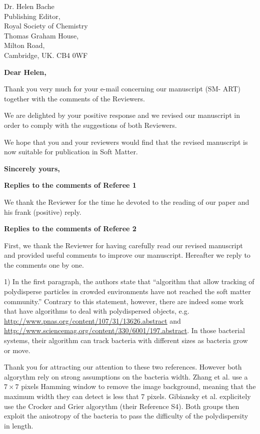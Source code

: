 \documentclass[a4paper, rebuttal, parskip=true, firsthead=false, fromemail=true, foldmarks=false]{scrlttr2}
\begin{document}
 
\begin{letter}{Dr. Helen Bache\\
Publishing Editor,\\
Royal Society of Chemistry\\
Thomas Graham House,\\
Milton Road,\\
Cambridge, UK. CB4 0WF}
\opening{\bf Dear Helen,}

Thank you very much for your e-mail concerning our manuscript (SM\nobreakdash- ART) together with the comments of the Reviewers.

We are delighted by your positive response and we revised our manuscript in order to comply with the suggestions of both Reviewers.


We hope that you and your reviewers would find that the revised manuscript is now suitable for publication in Soft Matter. 

\closing{\bf Sincerely yours,} 
\clearpage

\textsf{\textbf{Replies to the comments of Referee 1}}

We thank the Reviewer for the time he devoted to the reading of our paper and his frank (positive) reply.

\textsf{\textbf{Replies to the comments of Referee 2}}

First, we thank the Reviewer for having carefully read our revised manuscript and provided useful comments to improve our manuscript. 
Hereafter we reply to the comments one by one.

\begin{quotationi}
1)      In the first paragraph, the authors state that ``algorithm that allow tracking of polydisperse particles in crowded environments have not reached the soft matter community.'' Contrary to this statement, however, there are indeed some work that have algorithms to deal with polydispersed objects, e.g. \url{http://www.pnas.org/content/107/31/13626.abstract} and \url{http://www.sciencemag.org/content/330/6001/197.abstract}. In those bacterial systems, their algorithm can track bacteria with different sizes as bacteria grow or move.
\end{quotationi}

Thank you for attracting our attention to these two references. However both algorythm rely on strong assumptions on the bacteria width. Zhang et al. use a $7\times 7$ pixels Hamming window to remove the image background, meaning that the maximum width they can detect is less that 7 pixels. Gibiansky et al. explicitely use the Crocker and Grier algorythm (their Reference S4). Both groups then exploit the anisotropy of the bacteria to pass the difficulty of the polydispersity in length.


\end{letter}
\end{document}
